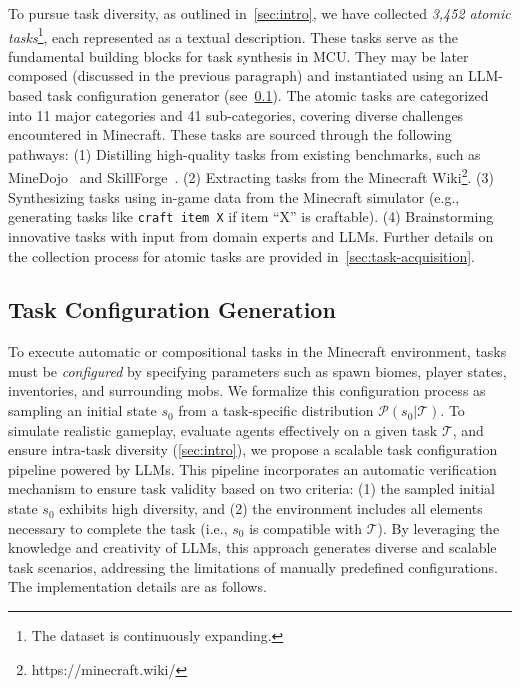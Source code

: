 To pursue task diversity, as outlined in~\cref{sec:intro}, we have collected \textit{3,452 atomic tasks}\footnote{The dataset is continuously expanding.}, each represented as a textual description. These tasks serve as the fundamental building blocks for task synthesis in MCU. They may be later composed (discussed in the previous paragraph) and instantiated using an LLM-based task configuration generator (see~\cref{sec:task_gen}). The atomic tasks are categorized into 11 major categories and 41 sub-categories, covering diverse challenges encountered in Minecraft. These tasks are sourced through the following pathways: (1) Distilling high-quality tasks from existing benchmarks, such as MineDojo~\citep{minedojo} and SkillForge~\citep{groot}. (2) Extracting tasks from the Minecraft Wiki\footnote{https://minecraft.wiki/}. (3) Synthesizing tasks using in-game data from the Minecraft simulator (e.g., generating tasks like \texttt{craft item X} if item ``X'' is craftable). (4) Brainstorming innovative tasks with input from domain experts and LLMs. Further details on the collection process for atomic tasks are provided in~\cref{sec:task-acquisition}.



\subsection{Task Configuration Generation}
\label{sec:task_gen}

To execute automatic or compositional tasks in the Minecraft environment, tasks must be \emph{configured} by specifying parameters such as spawn biomes, player states, inventories, and surrounding mobs. We formalize this configuration process as sampling an initial state $s_0$ from a task-specific distribution $\mathcal{P}(s_0 | \mathcal{T})$. To simulate realistic gameplay, evaluate agents effectively on a given task $\mathcal{T}$, and ensure intra-task diversity (\cref{sec:intro}), we propose a scalable task configuration pipeline powered by LLMs. This pipeline incorporates an automatic verification mechanism to ensure task validity based on two criteria: (1) the sampled initial state $s_0$ exhibits high diversity, and (2) the environment includes all elements necessary to complete the task (i.e., $s_0$ is compatible with $\mathcal{T}$). By leveraging the knowledge and creativity of LLMs, this approach generates diverse and scalable task scenarios, addressing the limitations of manually predefined configurations. The implementation details are as follows.


